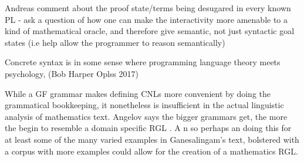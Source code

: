 Andreas comment about the proof state/terms being desugared in every known PL -
ask a question of how one can make the interactivity more amenable to a kind of
mathematical oracle, and therefore give semantic, not just syntactic goal states
(i.e help allow the programmer to reason semantically)

Concrete syntax is in some sense where programming language theory meets
psychology, (Bob Harper Oplss 2017)


While a GF grammar makes defining CNLs more convenient by doing the grammatical bookkeeping, it nonetheless is insufficient in the actual linguistic analysis of mathematics text.  Angelov says the bigger grammars get, the more the begin to resemble a domain specific RGL \cite{}. A
n so perhaps an doing this for at least some of the many varied examples in Ganesalingam's text, bolstered with a corpus with more examples could allow for the creation of a mathematics RGL.

